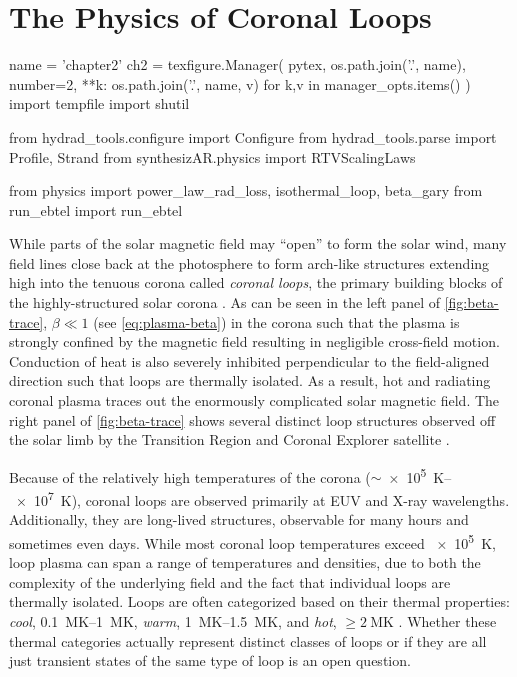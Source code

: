 \chapter{The Physics of Coronal Loops}\label{ch:loops}

\begin{pycode}[chapter2]
name = 'chapter2'
ch2 = texfigure.Manager(
    pytex,
    os.path.join('.', name),
    number=2,
    **{k: os.path.join('.', name, v) for k,v in manager_opts.items()}
)
import tempfile
import shutil

from hydrad_tools.configure import Configure
from hydrad_tools.parse import Profile, Strand
from synthesizAR.physics import RTVScalingLaws

from physics import power_law_rad_loss, isothermal_loop, beta_gary
from run_ebtel import run_ebtel
\end{pycode}

While parts of the solar magnetic field may ``open'' to form the solar wind, many field lines close back at the photosphere to form arch-like structures extending high into the tenuous corona called \textit{coronal loops}, the primary building blocks of the highly-structured solar corona \citep{reale_coronal_2010}. As can be seen in the left panel of \autoref{fig:beta-trace}, $\beta\ll1$ (see \autoref{eq:plasma-beta}) in the corona such that the plasma is strongly confined by the magnetic field resulting in negligible cross-field motion. Conduction of heat is also severely inhibited perpendicular to the field-aligned direction such that loops are thermally isolated. As a result, hot and radiating coronal plasma traces out the enormously complicated solar magnetic field. The right panel of \autoref{fig:beta-trace} shows several distinct loop structures observed off the solar limb by the Transition Region and Coronal Explorer satellite \citep[TRACE,][]{handy_transition_1999}.

Because of the relatively high temperatures of the corona ($\sim$\SIrange{e5}{e7}{\kelvin}), coronal loops are observed primarily at EUV and X-ray wavelengths. Additionally, they are long-lived structures, observable for many hours and sometimes even days. While most coronal loop temperatures exceed \SI{e5}{\kelvin}, loop plasma can span a range of temperatures and densities, due to both the complexity of the underlying field and the fact that individual loops are thermally isolated. Loops are often categorized based on their thermal properties: \textit{cool}, \SIrange{0.1}{1}{\mega\kelvin}, \textit{warm}, \SIrange{1}{1.5}{\mega\kelvin}, and \textit{hot}, $\ge\SI{2}{\mega\kelvin}$ \citep{reale_coronal_2010}. Whether these thermal categories actually represent distinct classes of loops or if they are all just transient states of the same type of loop is an open question. 


